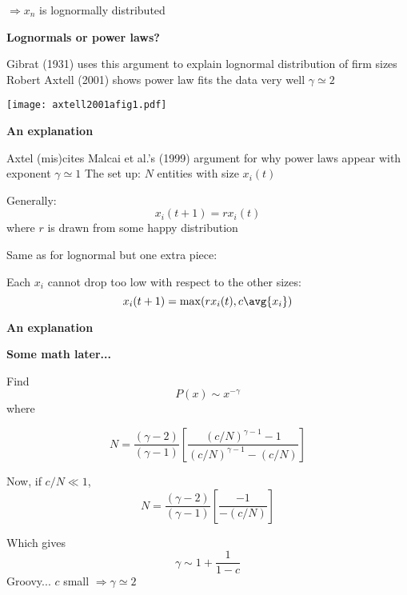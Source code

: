       $\Rightarrow x_{n}$ is lognormally distributed
    
    
  


  \textbf{Lognormals or power laws?}

  
   Gibrat\cite{gibrat1931a} (1931) uses this argument
    to explain lognormal distribution of firm sizes 
   Robert Axtell (2001) shows power
    law fits the data very well\cite{axtell2001a} {\hfill\alert{$\gamma \simeq 2$}}
  
    {\texttt{[image: axtell2001afig1.pdf]}}
  



  \textbf{An explanation}

  
   Axtel (mis)cites Malcai et al.'s (1999) argument\cite{malcai1999a}
    for why power laws appear with exponent $\gamma \simeq 1$
   The set up: $N$ entities with size $x_i(t)$
   
    Generally:
    $$
    x_i(t+1) = rx_i(t) 
    $$
    where $r$ is drawn from some happy distribution
   
    Same as for lognormal but one extra piece:
   
    Each $x_i$ cannot drop too low with respect to the other sizes:
    $$
    x_i(t+1) = \max(rx_i(t),c\avg{x_i})
    $$
  


  \textbf{An explanation}

  \textbf{Some math later...}
    
     Find
      $$ P(x) \sim x^{-\gamma} $$
      where
       
      $$
      N = \frac{(\gamma-2)}{(\gamma-1)}
      \left[
        \frac{(c/N)^{\gamma-1} - 1}
        {(c/N)^{\gamma-1} - (c/N)}
      \right]
      $$
    
      Now, if $c/N \ll 1$, 
      $$
      N = \frac{(\gamma-2)}{(\gamma-1)}
      \left[
        \frac{- 1}
        {- (c/N)}
      \right]
      $$
    
      Which gives
      $$
      \gamma  \sim 1 + \frac{1}{1-c}
      $$
     \alert{Groovy...}  $c$ small $\Rightarrow \gamma \simeq 2$
    
  
  


